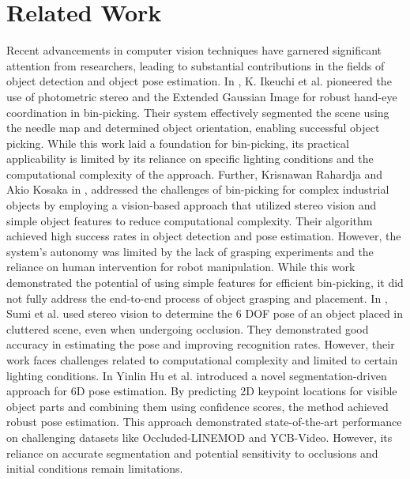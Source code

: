 \documentclass[conference]{IEEEtran}
\begin{document}
\section{Related Work}
Recent advancements in computer vision techniques have garnered significant attention from researchers, leading to substantial contributions in the fields of object detection and object pose estimation. In \cite{MITPAPER}, K. Ikeuchi et al. pioneered the use of photometric stereo and the Extended Gaussian Image for robust hand-eye coordination in bin-picking. Their system effectively segmented the scene using the needle map and determined object orientation, enabling successful object picking. While this work laid a foundation for bin-picking, its practical applicability is limited by its reliance on specific lighting conditions and the computational complexity of the approach. Further, Krisnawan Rahardja and Akio Kosaka in \cite{2NDPAPER}, addressed the challenges of bin-picking for complex industrial objects by employing a vision-based approach that utilized stereo vision and simple object features to reduce computational complexity.
 Their algorithm achieved high success rates in object detection and pose estimation. However, the system's autonomy was limited by the lack of grasping experiments and the reliance on human intervention for robot manipulation. While this work demonstrated the potential of using simple features for efficient bin-picking, it did not fully address the end-to-end process of object grasping and placement. In \cite{3D_object_recognition_in_cluttered_environment_using_stereo_vision}, Sumi et al.  used stereo vision to determine the 6 DOF pose of an object placed in cluttered scene, even when undergoing occlusion. They demonstrated good accuracy in estimating the pose and improving recognition rates. However, their work faces challenges related to computational complexity and limited to certain lighting conditions. In
\cite{Segmentation_driven_6D_pose} Yinlin Hu et al.
 introduced a novel segmentation-driven approach for 6D pose estimation. By predicting 2D keypoint locations for visible object parts and combining them using confidence scores, the method achieved robust pose estimation. This approach demonstrated state-of-the-art performance on challenging datasets like Occluded-LINEMOD and YCB-Video. However, its reliance on accurate segmentation and potential sensitivity to occlusions and initial conditions remain limitations.
\end{document}
